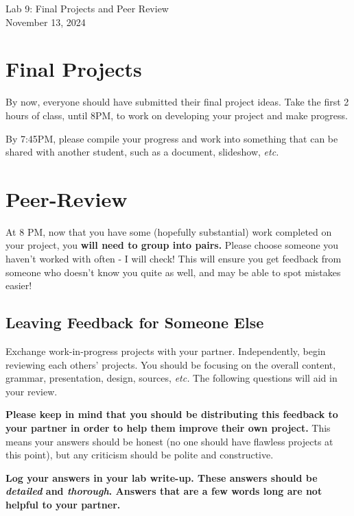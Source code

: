 \documentclass[11pt]{article}%
\begin{document}
\begin{center}
\huge{Lab 9: Final Projects and Peer Review}\\ \medskip \Large{November 13, 2024}
\end{center}

\section{Final Projects}

By now, everyone should have submitted their final project ideas. Take the first 2 hours of class, until 8PM, to work on developing your project and make progress.

By 7:45PM, please compile your progress and work into something that can be shared with another student, such as a document, slideshow, \textit{etc.}

\section{Peer-Review}

At 8 PM, now that you have some (hopefully substantial) work completed on your project, you \textbf{will need to group into pairs.} Please choose someone you haven't worked with often - I will check! This will ensure you get feedback from someone who doesn't know you quite as well, and may be able to spot mistakes easier!

\subsection{Leaving Feedback for Someone Else}

Exchange work-in-progress projects with your partner. Independently, begin reviewing each others' projects. You should be focusing on the overall content, grammar, presentation, design, sources, \textit{etc.} The following questions will aid in your review. 

\textbf{Please keep in mind that you should be distributing this feedback to your partner in order to help them improve their own project.} This means your answers should be honest (no one should have flawless projects at this point), but any criticism should be polite and constructive.

\textbf{Log your answers in your lab write-up. These answers should be \textit{detailed} and \textit{thorough}. Answers that are a few words long are not helpful to your partner.}
\end{document}
